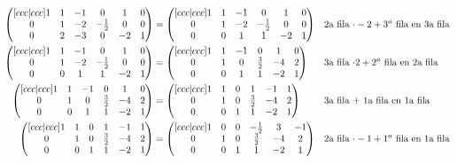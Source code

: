 \documentclass[letterpaper]{article}
\renewcommand{\*}{\cdot}
\theoremstyle{definition}
\begin{document}
\begin{align*}
		\begin{pmatrix}[ccc|ccc]
		1 & 1 & -1 & 0 & 1 & 0\\
		0 & 1 & -2 & -\frac{1}{2} & 0 & 0\\
		0 & 2 & -3 & 0 & -2 & 1
		\end{pmatrix} & = \begin{pmatrix}[ccc|ccc]
		1 & 1 & -1 & 0 & 1 & 0\\
		0 & 1 & -2 & -\frac{1}{2} & 0 & 0\\
		0 & 0 & 1 & 1 & -2 & 1
		\end{pmatrix} && \text{2a fila $ \* -2  + 3^a$ fila en 3a fila}\\
		\begin{pmatrix}[ccc|ccc]
		1 & 1 & -1 & 0 & 1 & 0\\
		0 & 1 & -2 & -\frac{1}{2} & 0 & 0\\
		0 & 0 & 1 & 1 & -2 & 1
		\end{pmatrix} & = \begin{pmatrix}[ccc|ccc]
		1 & 1 & -1 & 0 & 1 & 0\\
		0 & 1 & 0 & \frac{3}{2} & -4 & 2\\
		0 & 0 & 1 & 1 & -2 & 1
		\end{pmatrix} && \text{3a fila $ \* 2 + 2^a$ fila en 2a fila}\\
		\begin{pmatrix}[ccc|ccc]
		1 & 1 & -1 & 0 & 1 & 0\\
		0 & 1 & 0 & \frac{3}{2} & -4 & 2\\
		0 & 0 & 1 & 1 & -2 & 1
		\end{pmatrix} & = \begin{pmatrix}[ccc|ccc]
		1 & 1 & 0 & 1 & -1 & 1\\
		0 & 1 & 0 & \frac{3}{2} & -4 & 2\\
		0 & 0 & 1 & 1 & -2 & 1
		\end{pmatrix} && \text{3a fila + 1a fila en 1a fila}\\
		\begin{pmatrix}[ccc|ccc]
		1 & 1 & 0 & 1 & -1 & 1\\
		0 & 1 & 0 & \frac{3}{2} & -4 & 2\\
		0 & 0 & 1 & 1 & -2 & 1
		\end{pmatrix} & = \begin{pmatrix}[ccc|ccc]
		1 & 0 & 0 & -\frac{1}{2} & 3 & -1\\
		0 & 1 & 0 & \frac{3}{2} & -4 & 2\\
		0 & 0 & 1 & 1 & -2 & 1
		\end{pmatrix} && \text{2a fila $ \* -1  + 1^a $ fila en 1a fila}
	\end{align*}
\end{document}
